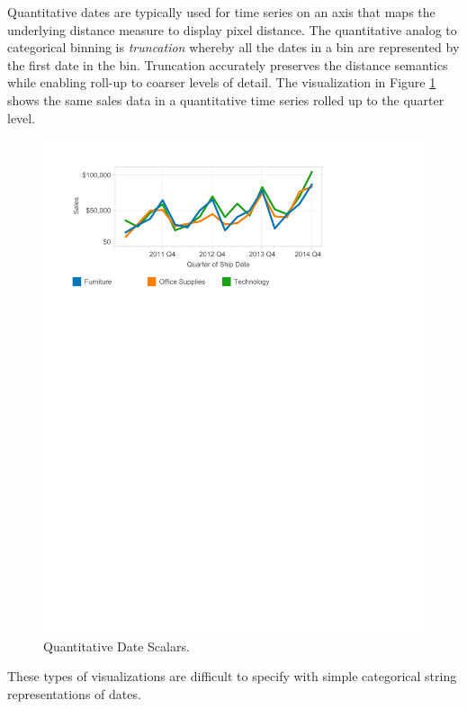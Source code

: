 Quantitative dates are typically used for time series on an axis that maps the underlying distance measure to display pixel distance. The quantitative analog to categorical binning is \textit{truncation} whereby all the dates in a bin are represented by the first date in the bin. Truncation accurately preserves the distance semantics while enabling roll-up to coarser levels of detail. The visualization in Figure \ref{fig:I2} shows the same sales data in a quantitative time series rolled up to the quarter level.

\begin{figure}[ht]
\centering
\includegraphics[width=\columnwidth]{figures/FigureI2}
\caption{Quantitative Date Scalars.}
\label{fig:I2}
\end{figure}

These types of visualizations are difficult to specify with simple categorical string representations of dates.

